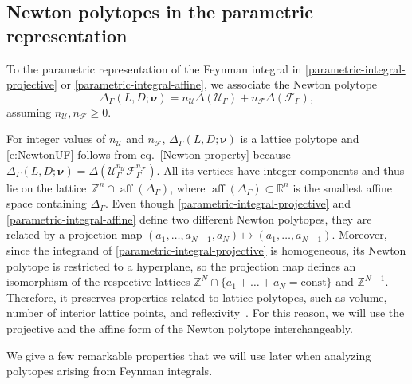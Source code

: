 \documentclass[12pt,a4paper]{article}
\theoremstyle{plain}
\theoremstyle{remark}
\newcommand{\cU}{\mathscr {U}}
\newcommand{\cF}{\mathscr {F}}
\newcommand{\undernotation}[1]{\pmb{#1}}
\newcommand{\Newton}{\Delta}
\DeclareMathOperator{\aff}{aff}
\begin{document}
        \subsection{Newton polytopes in the parametric representation}
        
		To the parametric representation of the Feynman integral in
		\cref{parametric-integral-projective} or \cref{parametric-integral-affine}, we associate the Newton polytope%
		\begin{equation}\label{e:NewtonUF}
			\Delta_\Gamma(L,D;\undernotation{\nu}) =
			n_\cU\Newton (\cU_\Gamma)+n_\cF\Newton(\cF_\Gamma),                
		\end{equation}
		assuming $n_\cU, n_\cF \geq 0$.
		
		For integer values of $n_\cU$ and $n_\cF$, $\Delta_\Gamma(L,D;\undernotation{\nu})$  is a lattice polytope and \cref{e:NewtonUF} follows from eq.~\eqref{Newton-property} because 
    $\Delta_\Gamma(L,D;\undernotation{\nu})=	\Newton(\cU_\Gamma^{n_\cU}\cF_\Gamma^{n_\cF})$.       All its vertices have integer components and thus lie on the lattice~$\mathbb{Z}^n \cap \aff(\Delta_\Gamma)$, where $\aff(\Delta_\Gamma) \subset \mathbb{R}^n$ is the smallest affine space containing $\Delta_\Gamma$. Even though \cref{parametric-integral-projective} and \cref{parametric-integral-affine} define two different Newton polytopes, they are related by a projection map $(a_1, \dots, a_{N-1}, a_N) \mapsto (a_1, \dots, a_{N-1})$. Moreover, since the integrand of \cref{parametric-integral-projective} is homogeneous, its Newton polytope is restricted to a hyperplane, so the projection map defines an isomorphism of the respective lattices $\mathbb{Z}^N \cap \{a_1 + \dots + a_N = \mathrm{const}\}$ and $\mathbb{Z}^{N-1}$. Therefore, it preserves properties related to lattice polytopes, such as volume, number of interior lattice points, and reflexivity~\cite{Haase:2012,Beck:2015}. For this reason, we will use the projective and the affine form of the Newton polytope interchangeably.

                \medskip
		We give a few remarkable properties that we will use later when
		analyzing  polytopes arising from Feynman integrals.
		
\end{document}
